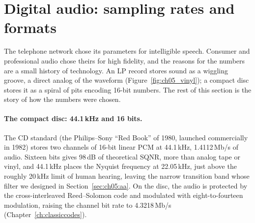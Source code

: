 \section{Digital audio: sampling rates and formats}
\label{sec:ch05:audio}

The telephone network chose its parameters for intelligible speech. Consumer and professional
audio chose theirs for high fidelity, and the reasons for the numbers are a small history of
technology. An LP record stores sound as a wiggling groove, a direct analog of the waveform
(Figure~\ref{fig:ch05_vinyl}); a compact disc stores it as a spiral of pits encoding 16-bit numbers.
The rest of this section is the story of how the numbers were chosen.


\paragraph{The compact disc: 44.1\,kHz and 16 bits.} The CD standard (the Philips--Sony ``Red
Book'' of 1980, launched commercially in 1982) stores two channels of 16-bit linear PCM at
44.1\,kHz, 1.4112\,Mb/s of audio. Sixteen bits gives 98\,dB of theoretical SQNR, more than
analog tape or vinyl, and 44.1\,kHz places the Nyquist frequency at 22.05\,kHz, just above the
roughly 20\,kHz limit of human hearing, leaving the narrow transition band whose filter we
designed in Section~\ref{sec:ch05:aa}. On the disc, the audio is protected by the cross-interleaved
Reed--Solomon code and modulated with eight-to-fourteen modulation, raising the channel bit rate to
4.3218\,Mb/s (Chapter~\ref{ch:classiccodes}).

